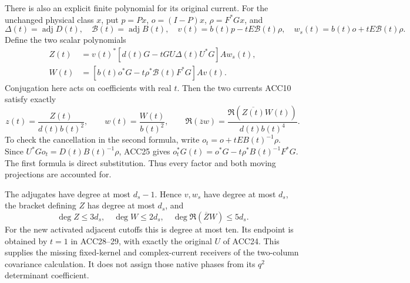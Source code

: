 \documentclass[11pt]{article}
\begin{document}
There is also an explicit finite polynomial for its original current.
For the unchanged physical class \(x\), put \(p=Px\), \(o=(I-P)x\),
\(\rho=F^*Gx\), and
\[
\Delta(t)=\operatorname{adj}D(t),\quad
\mathcal B(t)=\operatorname{adj}B(t),\quad
v(t)=b(t)p-tE\mathcal B(t)\rho,\quad
w_s(t)=b(t)o+tE\mathcal B(t)\rho .
\]
Define the two scalar polynomials
\begin{equation}\tag{ACC28}
\begin{aligned}
Z(t)&=v(t)^*[d(t)G-tGU\Delta(t)U^*G]A w_s(t),\\
W(t)&=[b(t)o^*G-t\rho^*\mathcal B(t)F^*G]A v(t).
\end{aligned}
\end{equation}
Conjugation here acts on coefficients with real \(t\).
Then the two currents ACC10 satisfy exactly
\begin{equation}\tag{ACC29}
z(t)=\frac{Z(t)}{d(t)b(t)^2},\qquad
w(t)=\frac{W(t)}{b(t)^2},\qquad
\Re(\overline zw)=\frac{\Re(\overline{Z(t)}W(t))}{d(t)b(t)^4}.
\end{equation}
To check the cancellation in the second formula, write
\(o_t=o+tEB(t)^{-1}\rho\).
Since \(U^*Go_t=D(t)B(t)^{-1}\rho\), ACC25 gives
\(o_t^*G(t)=o^*G-t\rho^*B(t)^{-1}F^*G\).
The first formula is direct substitution. Thus every factor and
both moving projections are accounted for.

The adjugates have degree at most \(d_s-1\).
Hence \(v,w_s\) have degree at most \(d_s\), the bracket defining
\(Z\) has degree at most \(d_s\), and
\[
\deg Z\le3d_s,\quad \deg W\le2d_s,\quad
\deg\Re(\overline ZW)\le5d_s.
\]
For the new activated adjacent cutoffs this is degree at most ten.
Its endpoint is obtained by \(t=1\) in ACC28--29, with exactly
the original \(U\) of ACC24. This supplies the missing fixed-kernel
and complex-current receivers of the two-column covariance
calculation. It does not assign those native phases from its
\(q^2\) determinant coefficient.
\end{document}
